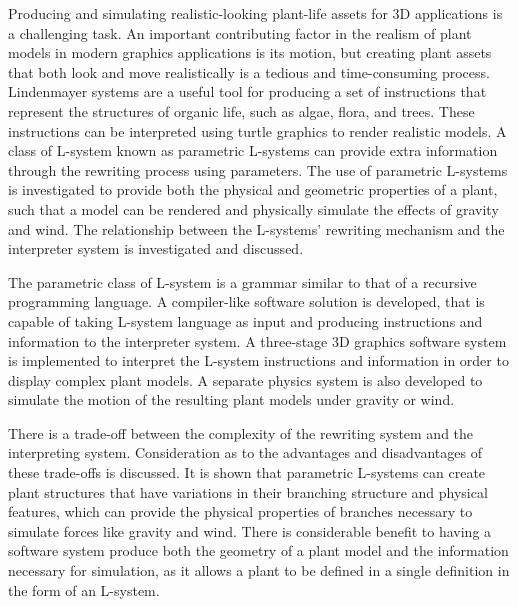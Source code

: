 Producing and simulating realistic-looking plant-life assets for 3D applications is a challenging task. An important contributing factor in the realism of plant models in modern graphics applications is its motion, but creating plant assets that both look and move realistically is a tedious and time-consuming process. Lindenmayer systems are a useful tool for producing a set of instructions that represent the structures of organic life, such as algae, flora, and trees. These instructions can be interpreted using turtle graphics to render realistic models. A class of L-system known as parametric L-systems can provide extra information through the rewriting process using parameters. The use of parametric L-systems is investigated to provide both the physical and geometric properties of a plant, such that a model can be rendered and physically simulate the effects of gravity and wind. The relationship between the  L-systems' rewriting mechanism and the interpreter system is investigated and discussed. 

The parametric class of L-system is a grammar similar to that of a recursive programming language. A compiler-like software solution is developed, that is capable of taking L-system language as input and producing instructions and information to the interpreter system. A three-stage 3D graphics software system is implemented to interpret the L-system instructions and information in order to display complex plant models. A separate physics system is also developed to simulate the motion of the resulting plant models under gravity or wind.

There is a trade-off between the complexity of the rewriting system and the interpreting system. Consideration as to the advantages and disadvantages of these trade-offs is discussed. It is shown that parametric L-systems can create plant structures that have variations in their branching structure and physical features, which can provide the physical properties of branches necessary to simulate forces like gravity and wind. There is considerable benefit to having a software system produce both the geometry of a plant model and the information necessary for simulation, as it allows a plant to be defined in a single definition in the form of an L-system.
